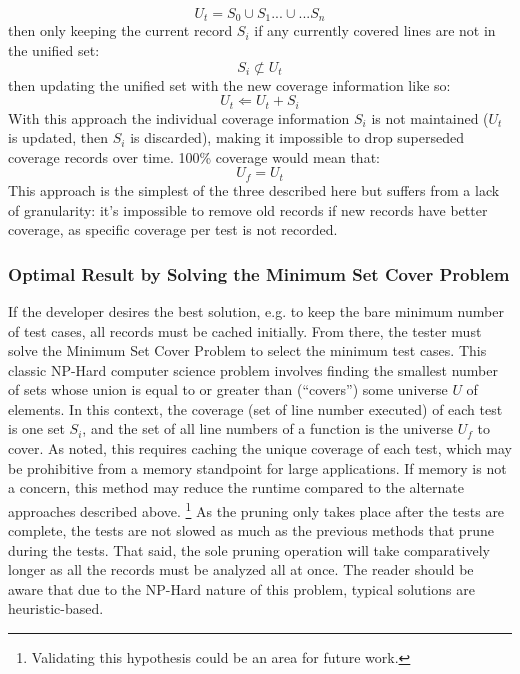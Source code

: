 \begin{equation*}
  U_t = S_0 \cup S_1 ...\cup... S_n
\end{equation*}
then only keeping the current record $S_i$ if any currently 
covered lines are not in the unified set:
\begin{equation*}
  S_i \not \subset U_t
\end{equation*}
then updating the unified set with the new coverage information like so:
\begin{equation*}
  U_t \Leftarrow U_t + S_i
\end{equation*} 
With this approach the individual coverage information $S_i$ is not maintained 
($U_t$ is updated, then $S_i$ is discarded), making it impossible to drop superseded 
coverage records over time.  100\% coverage would mean that:
\begin{equation*}
  U_f = U_t
\end{equation*} 
This approach is the simplest of the three described here but suffers from a 
lack of granularity: it's impossible to remove old records if new records have 
better coverage, as specific coverage per test is not recorded.

\subsubsection{Optimal Result by Solving the Minimum Set Cover Problem}\label{sec:tuning-2}
If the developer desires the best solution, e.g. to keep the bare minimum
number of test cases, all records must be cached initially.  
From there, the tester must solve the Minimum Set Cover Problem
\cite{hassin2005better} to select the minimum test cases.
This classic NP-Hard computer science problem involves finding the smallest number
of sets whose union is equal to or greater than (“covers”) some universe $U$ of elements.  
In this context, the coverage (set of line number executed) of each test is one set $S_i$,
and the set of all line numbers of a function is the universe $U_f$ to cover.  
As noted, this requires caching the unique coverage of each test, which may 
be prohibitive from a memory standpoint for large applications.
If memory is not a concern, this method may reduce the runtime 
compared to the alternate approaches described above. \footnote{Validating this hypothesis
could be an area for future work.} As the pruning 
only takes place after the tests are complete, the tests are not slowed as much
as the previous methods that prune during the tests.  That said, the sole
pruning operation will take comparatively longer as all the records must be 
analyzed all at once. The reader should be aware that due to the NP-Hard
nature of this problem, typical solutions are heuristic-based.
   
